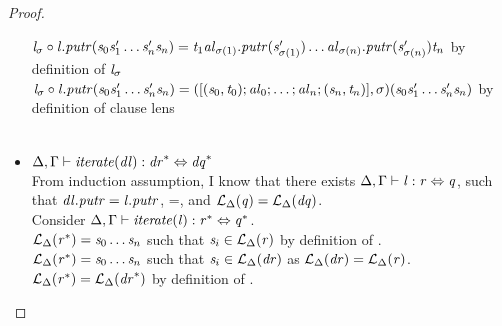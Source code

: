 \begin{lemma}
\begin{proof}
\begin{itemize}
$\mathit{l}_{\sigma} \circ \mathit{l}.\mathit{putr}(\mathit{s}_0\mathit{s}_1'\ldots\mathit{s}_n'\mathit{s}_n)=\mathit{t}_1\mathit{al}_{\sigma(1)}.\mathit{putr}(\mathit{s}_{\sigma(1)}')\ldots\mathit{al}_{\sigma(n)}.\mathit{putr}(\mathit{s}_{\sigma(n)}')\mathit{t}_n$ by definition of $\mathit{l}_{\sigma}$\\
$\mathit{l}_{\sigma} \circ \mathit{l}.\mathit{putr}(\mathit{s}_0\mathit{s}_1'\ldots\mathit{s}_n'\mathit{s}_n)=([(\mathit{s}_0,\mathit{t}_0);\mathit{al}_0;\ldots;\mathit{al}_n;(\mathit{s}_n,\mathit{t}_n)],\sigma)(\mathit{s}_0\mathit{s}_1'\ldots\mathit{s}_n'\mathit{s}_n)$ by definition of clause lens\\
\\
\item$\Delta, \Gamma \vdash \mathit{iterate(\mathit{dl})} : \mathit{dr}^* \Leftrightarrow \mathit{dq}^*$\\
From induction assumption, I know that there exists $\Delta, \Gamma \vdash \mathit{l} : \mathit{r} \Leftrightarrow \mathit{q}$, such that
$\mathit{dl}.\mathit{putr}=\mathit{l}.\mathit{putr}$,
\LanguageOf{\RegexContext}{\Regex}=\LanguageOf{\RegexContext}{\DNFRegex}, and
$\mathcal{L}_{\Delta}(\mathit{q})=\mathcal{L}_{\Delta}(\mathit{dq})$.\\
Consider $\Delta, \Gamma \vdash \mathit{iterate(\mathit{l})} : \mathit{r}^* \Leftrightarrow \mathit{q}^*$.\\
$\mathcal{L}_{\Delta}(\mathit{r}^*) = \mathit{s}_0\ldots\mathit{s}_n$ such that $\mathit{s}_i \in \mathcal{L}_{\Delta}(\mathit{r})$ by definition of \LanguageOf{\Delta}{\Star{\Regex}}.\\
$\mathcal{L}_{\Delta}(\mathit{r}^*) = \mathit{s}_0\ldots\mathit{s}_n$ such that $\mathit{s}_i \in \mathcal{L}_{\Delta}(\mathit{dr})$ as $\mathcal{L}_{\Delta}(\mathit{dr})=\mathcal{L}_{\Delta}(\mathit{r})$.\\
$\mathcal{L}_{\Delta}(\mathit{r}^*) = \mathcal{L}_{\Delta}(\mathit{dr}^*)$ by definition of \LanguageOf{\RegexContext}{\Star{\DNFRegex}}.


\end{itemize}
\end{proof}
\end{lemma}
